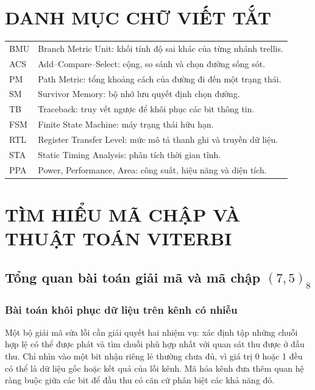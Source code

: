 \documentclass[12pt,a4paper]{article}
\renewcommand{\_}{\originalunderscore\allowbreak}
\begin{document}
\section*{DANH MỤC CHỮ VIẾT TẮT}
\begin{tabularx}{\textwidth}{@{}P{1.8cm}Y@{}}\toprule
BMU & Branch Metric Unit: khối tính độ sai khác của từng nhánh trellis.\\
ACS & Add--Compare--Select: cộng, so sánh và chọn đường sống sót.\\
PM & Path Metric: tổng khoảng cách của đường đi đến một trạng thái.\\
SM & Survivor Memory: bộ nhớ lưu quyết định chọn đường.\\
TB & Traceback: truy vết ngược để khôi phục các bit thông tin.\\
FSM & Finite State Machine: máy trạng thái hữu hạn.\\
RTL & Register Transfer Level: mức mô tả thanh ghi và truyền dữ liệu.\\
STA & Static Timing Analysis: phân tích thời gian tĩnh.\\
PPA & Power, Performance, Area: công suất, hiệu năng và diện tích.\\
\bottomrule\end{tabularx}
\clearpage{}

\clearpage
\section{TÌM HIỂU MÃ CHẬP VÀ THUẬT TOÁN VITERBI}\label{sec:algorithm}

\subsection{Tổng quan bài toán giải mã và mã chập $(7,5)_8$}

\subsubsection{Bài toán khôi phục dữ liệu trên kênh có nhiễu}
Một bộ giải mã sửa lỗi cần giải quyết hai nhiệm vụ: xác định tập những chuỗi hợp lệ có thể được phát và tìm chuỗi phù hợp nhất với quan sát thu được ở đầu thu. Chỉ nhìn vào một bit nhận riêng lẻ thường chưa đủ, vì giá trị 0 hoặc 1 đều có thể là dữ liệu gốc hoặc kết quả của lỗi kênh. Mã hóa kênh đưa thêm quan hệ ràng buộc giữa các bit để đầu thu có căn cứ phân biệt các khả năng đó.
\end{document}
